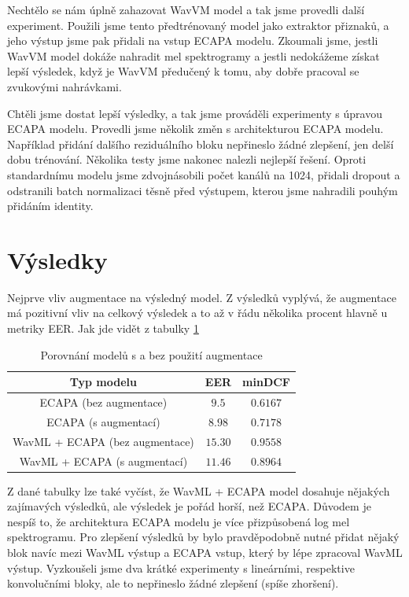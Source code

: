 \documentclass{article}
\begin{document}
Nechtělo se nám úplně zahazovat WavVM model a tak jsme provedli další experiment. Použili jsme tento předtrénovaný model jako  extraktor přiznaků, a jeho výstup jsme pak přidali na vstup ECAPA modelu. Zkoumali jsme, jestli WavVM model dokáže nahradit mel spektrogramy a jestli nedokážeme získat lepší výsledek, když je WavVM předučený k tomu, aby dobře pracoval se zvukovými nahrávkami.

Chtěli jsme dostat lepší výsledky, a tak jsme prováděli experimenty s úpravou ECAPA modelu. Provedli jsme několik změn s architekturou ECAPA modelu. Například přidání dalšího reziduálního bloku nepřineslo žádné zlepšení, jen delší dobu trénování. Několika testy jsme nakonec nalezli nejlepší řešení. Oproti standardnímu modelu jsme zdvojnásobili počet kanálů na 1024, přidali dropout a odstranili batch normalizaci těsně před výstupem, kterou jsme nahradili pouhým přidáním identity.

\section{Výsledky} \label{kon}

Nejprve vliv augmentace na výsledný model. Z výsledků vyplývá, že augmentace  má pozitivní vliv na celkový výsledek a to až v řádu několika procent hlavně u metriky EER. Jak jde vidět z tabulky \ref{augment_results} 

\begin{table}[h]
\centering
\begin{tabular}{|c|c|c|}
\hline
Typ modelu                   & EER  & minDCF \\ \hline
ECAPA (bez augmentace) & $9.5$  & $0.6167$ \\ \hline
ECAPA (s augmentací)   & $8.98$ & $0.7178$ \\ \hline
WavML + ECAPA (bez augmentace) & $15.30$ & $0.9558$ \\ \hline
WavML + ECAPA (s augmentací) & $11.46$ & $0.8964$ \\ \hline
\end{tabular}
\caption{Porovnání modelů s a bez použití augmentace}
\label{augment_results}
\end{table}

Z dané tabulky lze také vyčíst, že WavML + ECAPA model dosahuje nějakých zajímavých výsledků, ale výsledek je pořád horší, než ECAPA. Důvodem je nespíš to, že architektura ECAPA modelu je více přizpůsobená log mel spektrogramu. Pro zlepšení výsledků by bylo pravděpodobně nutné přidat nějaký blok navíc mezi WavML výstup a ECAPA vstup, který by lépe zpracoval WavML výstup. Vyzkoušeli jsme dva krátké experimenty s lineárními, respektive konvolučními bloky, ale to nepřineslo žádné zlepšení (spíše zhoršení).
\end{document}
